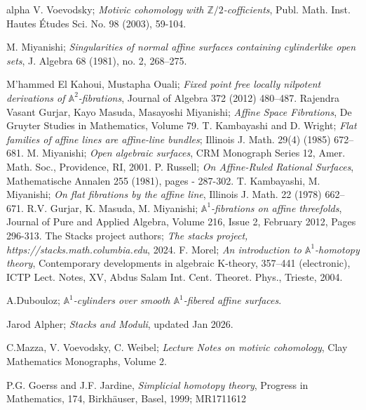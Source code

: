 \documentclass[11pt, reqno]{amsart}
\theoremstyle{plain}
\theoremstyle{definition}
\begin{document}
\begin{thebibliography}{alpha}
		 V. Voevodsky; \emph{Motivic cohomology with $\mathbb{Z}/2$-cofficients}, Publ. Math. Inst. Hautes \'Etudes Sci. No. 98 (2003), 59-104.  
		
		 M. Miyanishi; \emph{Singularities of normal affine surfaces containing cylinderlike open sets}, J. Algebra 68 (1981), no. 2, 268–275.
		
		 M’hammed El Kahoui, Mustapha Ouali; \emph{Fixed point free locally nilpotent derivations of $\mathbb{A}^2$-fibrations}, Journal of Algebra 372 (2012) 480–487.
		 Rajendra Vasant Gurjar, Kayo Masuda, Masayoshi Miyanishi; \emph{Affine Space Fibrations}, De Gruyter Studies in Mathematics, Volume 79.
		  T. Kambayashi and D. Wright; \emph{Flat families of affine lines are affine-line bundles};
		Illinois J. Math. 29(4) (1985) 672–681.
		  M. Miyanishi; \emph{Open algebraic surfaces}, CRM Monograph Series 12, Amer. Math. Soc., Providence, RI, 2001. 
		 P. Russell; \emph{On Affine-Ruled Rational Surfaces}, Mathematische Annalen 255 (1981), pages - 287-302.
		 T. Kambayashi, M. Miyanishi; \emph{On flat fibrations by the affine line}, Illinois J. Math. 22 (1978) 662–671.
		 R.V. Gurjar, K. Masuda, M. Miyanishi; \emph{$\mathbb{A}^1$-fibrations on affine threefolds}, Journal of Pure and Applied Algebra, Volume 216, Issue 2, February 2012, Pages 296-313.
		 The Stacks project authors; \emph{The stacks project, https://stacks.math.columbia.edu}, 2024.
		 F. Morel; \emph{An introduction to $\mathbb{A}^1$-homotopy theory}, Contemporary developments in
		algebraic K-theory, 357–441 (electronic), ICTP Lect. Notes, XV, Abdus Salam Int.
		Cent. Theoret. Phys., Trieste, 2004.
		
		 A.Dubouloz; \emph{$\mathbb{A}^1$-cylinders over smooth $\mathbb{A}^1$-fibered affine surfaces}.
		
		 Jarod Alpher; \emph{Stacks and Moduli}, updated Jan 2026.
		
		 C.Mazza, V. Voevodsky, C. Weibel; \emph{Lecture Notes on motivic cohomology}, Clay Mathematics Monographs, Volume 2.
		
		 P.G. Goerss and J.F. Jardine, \emph{Simplicial homotopy theory}, Progress in Mathematics, 174, Birkh\"auser, Basel, 1999; MR1711612
		

\end{thebibliography}
\end{document}
